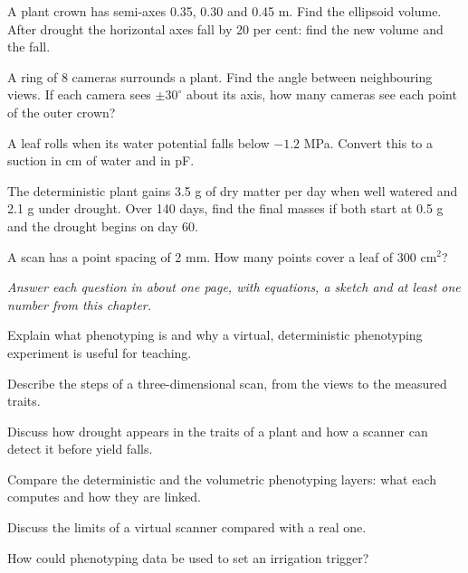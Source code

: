 \begin{exlist}
\item A plant crown has semi-axes 0.35, 0.30 and 0.45 m. Find the ellipsoid volume. After drought the horizontal axes fall by 20 per cent: find the new volume and the fall.
\item A ring of 8 cameras surrounds a plant. Find the angle between neighbouring views. If each camera sees $\pm30^\circ$ about its axis, how many cameras see each point of the outer crown?
\item A leaf rolls when its water potential falls below $-1.2$ MPa. Convert this to a suction in cm of water and in pF.
\item The deterministic plant gains 3.5 g of dry matter per day when well watered and 2.1 g under drought. Over 140 days, find the final masses if both start at 0.5 g and the drought begins on day 60.
\item A scan has a point spacing of 2 mm. How many points cover a leaf of 300 cm$^2$?
\end{exlist}
{\small\itshape Answer each question in about one page, with equations, a sketch and at least one number from this chapter.}\par\vspace{3pt}
\begin{exlist}
\item Explain what phenotyping is and why a virtual, deterministic phenotyping experiment is useful for teaching.
\item Describe the steps of a three-dimensional scan, from the views to the measured traits.
\item Discuss how drought appears in the traits of a plant and how a scanner can detect it before yield falls.
\item Compare the deterministic and the volumetric phenotyping layers: what each computes and how they are linked.
\item Discuss the limits of a virtual scanner compared with a real one.
\item How could phenotyping data be used to set an irrigation trigger?
\end{exlist}
